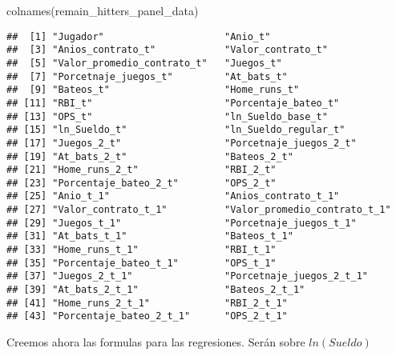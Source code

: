 \documentclass[
]{article}
\newenvironment{Shaded}{\begin{snugshade}}{\end{snugshade}}
\newcommand{\FunctionTok}[1]{\textcolor[rgb]{0.00,0.00,0.00}{#1}}
\newcommand{\NormalTok}[1]{#1}
\begin{document}
\begin{Shaded}
\begin{Highlighting}[]
\FunctionTok{colnames}\NormalTok{(remain\_hitters\_panel\_data)}
\end{Highlighting}
\end{Shaded}

\begin{verbatim}
##  [1] "Jugador"                     "Anio_t"                     
##  [3] "Anios_contrato_t"            "Valor_contrato_t"           
##  [5] "Valor_promedio_contrato_t"   "Juegos_t"                   
##  [7] "Porcetnaje_juegos_t"         "At_bats_t"                  
##  [9] "Bateos_t"                    "Home_runs_t"                
## [11] "RBI_t"                       "Porcentaje_bateo_t"         
## [13] "OPS_t"                       "ln_Sueldo_base_t"           
## [15] "ln_Sueldo_t"                 "ln_Sueldo_regular_t"        
## [17] "Juegos_2_t"                  "Porcetnaje_juegos_2_t"      
## [19] "At_bats_2_t"                 "Bateos_2_t"                 
## [21] "Home_runs_2_t"               "RBI_2_t"                    
## [23] "Porcentaje_bateo_2_t"        "OPS_2_t"                    
## [25] "Anio_t_1"                    "Anios_contrato_t_1"         
## [27] "Valor_contrato_t_1"          "Valor_promedio_contrato_t_1"
## [29] "Juegos_t_1"                  "Porcetnaje_juegos_t_1"      
## [31] "At_bats_t_1"                 "Bateos_t_1"                 
## [33] "Home_runs_t_1"               "RBI_t_1"                    
## [35] "Porcentaje_bateo_t_1"        "OPS_t_1"                    
## [37] "Juegos_2_t_1"                "Porcetnaje_juegos_2_t_1"    
## [39] "At_bats_2_t_1"               "Bateos_2_t_1"               
## [41] "Home_runs_2_t_1"             "RBI_2_t_1"                  
## [43] "Porcentaje_bateo_2_t_1"      "OPS_2_t_1"
\end{verbatim}

Creemos ahora las formulas para las regresiones. Serán sobre
\(ln(Sueldo)\)
\end{document}
